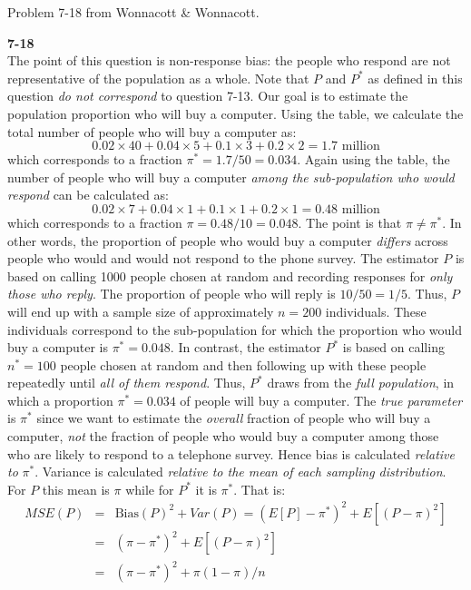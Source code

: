 \documentclass[addpoints,12pt]{exam}\usepackage[]{graphicx}\usepackage[]{xcolor}
\begin{document}
\begin{questions}
  \question Problem 7-18 from Wonnacott \& Wonnacott. 
    \begin{solution}
    \textbf{7-18}\\
    The point of this question is non-response bias: the people who respond are not representative of the population as a whole. Note that $P$ and $P^*$ as defined in this question \emph{do not correspond} to question 7-13. Our goal is to estimate the population proportion who will buy a computer. Using the table, we calculate the total number of people who will buy a computer as:
  $$0.02 \times 40 + 0.04\times 5 + 0.1\times 3 + 0.2\times 2 = 1.7 \mbox{ million}$$
which corresponds to a fraction $\pi^* = 1.7/50 = 0.034$. Again using the table, the number of people who will buy a computer \emph{among the sub-population who would respond} can be calculated as:
	$$0.02 \times 7 + 0.04\times 1 + 0.1\times 1 + 0.2\times 1 =  0.48 \mbox{ million}$$
which corresponds to a fraction $\pi = 0.48/10 = 0.048$. The point is that $\pi \neq \pi^*$. In other words, the proportion of people who would buy a computer \emph{differs} across people who would and would not respond to the phone survey. The estimator $P$ is based on calling 1000 people chosen at random and recording responses for \emph{only those who reply}. The proportion of people who will reply is $10/50 = 1/5$. Thus, $P$ will end up with a sample size of approximately $n=200$ individuals. These individuals correspond to the sub-population for which the proportion who would buy a computer is $\pi^* = 0.048$. In contrast, the estimator $P^*$ is based on calling $n^* = 100$ people chosen at random and then following up with these people repeatedly until \emph{all of them respond}. Thus, $P^*$ draws from the \emph{full population}, in which a proportion $\pi^* = 0.034$ of people will buy a computer. The \emph{true parameter} is $\pi^*$ since we want to estimate the \emph{overall} fraction of people who will buy a computer, \emph{not} the fraction of people who would buy a computer among those who are likely to respond to a telephone survey. Hence bias is calculated \emph{relative to} $\pi^*$. Variance is calculated \emph{relative to the mean of each sampling distribution}. For $P$ this mean is $\pi$ while for $P^*$ it is $\pi^*$. That is:
	\begin{eqnarray*}
		MSE(P) &=& \mbox{Bias}(P)^2 + Var(P) = (E[P] - \pi^*)^2 + E[(P - \pi)^2]\\
		&=& (\pi - \pi^*)^2 + E[(P - \pi)^2]\\
		&=&  (\pi - \pi^*)^2 + \pi(1-\pi)/n\\

\end{eqnarray*}
\end{solution}
\end{questions}
\end{document}
